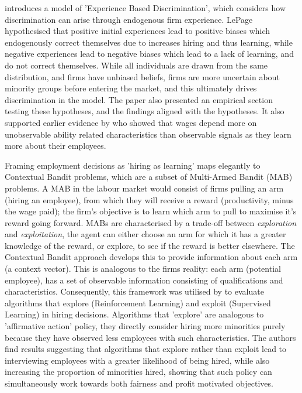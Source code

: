 \documentclass[]{article}
\begin{document}
\citet{Lepage2024} introduces a model of 'Experience Based Discrimination', which considers how discrimination can arise through endogenous firm experience. LePage hypothesised that positive initial experiences lead to positive biases which endogenously correct themselves due to increases hiring and thus learning, while negative experiences lead to negative biases which lead to a lack of learning, and do not correct themselves. While all individuals are drawn from the same distribution, and firms have unbiased beliefs, firms are more uncertain about minority groups before entering the market, and this ultimately drives discrimination in the model. The paper also presented an empirical section testing these hypotheses, and the findings aligned with the hypotheses. It also supported earlier evidence by \citet{AltonjiPierret2001} who showed that wages depend more on unobservable ability related characteristics than observable signals as they learn more about their employees.

Framing employment decisions as 'hiring as learning' maps elegantly to Contextual Bandit problems, which are a subset of Multi-Armed Bandit (MAB) problems. A MAB in the labour market would consist of firms pulling an arm (hiring an employee), from which they will receive a reward (productivity, minus the wage paid); the firm's objective is to learn which arm to pull to maximise it's reward going forward. MABs are characterised by a trade-off between \textit{exploration} and \textit{exploitation}, the agent can either choose an arm for which it has a greater knowledge of the reward, or explore, to see if the reward is better elsewhere. The Contextual Bandit approach develops this to provide information about each arm (a context vector).
This is analogous to the firms reality: each arm (potential employee), has a set of observable information consisting of qualifications and characteristics. Consequently, this framework was utilised by \citet{LiRaymondBergman2020}  to evaluate algorithms that explore (Reinforcement Learning) and exploit (Supervised Learning) in hiring decisions. Algorithms that 'explore' are analogous to 'affirmative action' policy, they directly consider hiring more minorities purely because they have observed less employees with such characteristics. The authors find results suggesting that algorithms that explore rather than exploit lead to interviewing employees with a greater likelihood of being hired, while also increasing the proportion of minorities hired, showing that such policy can simultaneously work towards both fairness and profit motivated objectives.
\end{document}
